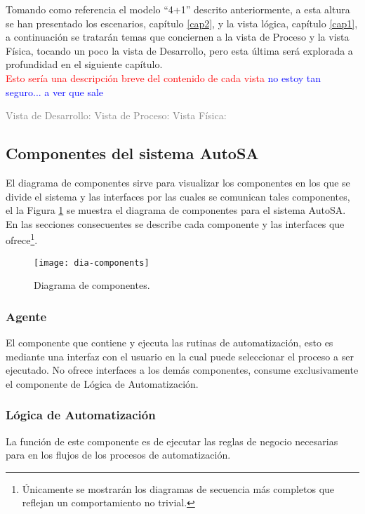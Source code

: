 Tomando como referencia el modelo ``4+1'' descrito anteriormente, a esta altura se han presentado los escenarios, capítulo \ref{cap2}, y la vista lógica, capítulo \ref{cap1}, a continuación se tratarán temas que conciernen a la vista de Proceso y la vista Física, tocando un poco la vista de Desarrollo, pero esta última será explorada a profundidad en el siguiente capítulo.\\

\textcolor{red}{Esto sería una descripción breve del contenido de cada vista}
\textcolor{blue}{no estoy tan seguro... a ver que sale}

\textcolor{gray}{
Vista de Desarrollo:
Vista de Proceso:
Vista Física:
}


\subsection{Componentes del sistema AutoSA}
El diagrama de componentes sirve para visualizar los componentes en los que se divide el sistema y las interfaces por las cuales se comunican tales componentes, el la Figura \ref{fig:dia-components} se muestra el diagrama de componentes para el sistema AutoSA. En las secciones consecuentes se describe cada componente y las interfaces que ofrece\footnote{Únicamente se mostrarán los diagramas de secuencia más completos que reflejan un comportamiento no trivial.}.
\begin{figure}[h]
\centering
\texttt{[image: dia-components]}
\caption{Diagrama de componentes.}
\label{fig:dia-components}
\end{figure}

\subsubsection{Agente}
El componente que contiene y ejecuta las rutinas de automatización, esto es mediante una interfaz con el usuario en la cual puede seleccionar el proceso a ser ejecutado. No ofrece interfaces a los demás componentes, consume exclusivamente el componente de Lógica de Automatización.\\

\subsubsection{Lógica de Automatización}
La función de este componente es de ejecutar las reglas de negocio necesarias para en los flujos de los procesos de automatización.  
